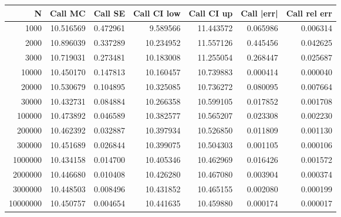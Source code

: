 \begin{tabular}{rrrrrrr}
\toprule
N & Call MC & Call SE & Call CI low & Call CI up & Call |err| & Call rel err \\
\midrule
1000 & 10.516569 & 0.472961 & 9.589566 & 11.443572 & 0.065986 & 0.006314 \\
2000 & 10.896039 & 0.337289 & 10.234952 & 11.557126 & 0.445456 & 0.042625 \\
3000 & 10.719031 & 0.273481 & 10.183008 & 11.255054 & 0.268447 & 0.025687 \\
10000 & 10.450170 & 0.147813 & 10.160457 & 10.739883 & 0.000414 & 0.000040 \\
20000 & 10.530679 & 0.104895 & 10.325085 & 10.736272 & 0.080095 & 0.007664 \\
30000 & 10.432731 & 0.084884 & 10.266358 & 10.599105 & 0.017852 & 0.001708 \\
100000 & 10.473892 & 0.046589 & 10.382577 & 10.565207 & 0.023308 & 0.002230 \\
200000 & 10.462392 & 0.032887 & 10.397934 & 10.526850 & 0.011809 & 0.001130 \\
300000 & 10.451689 & 0.026844 & 10.399075 & 10.504303 & 0.001105 & 0.000106 \\
1000000 & 10.434158 & 0.014700 & 10.405346 & 10.462969 & 0.016426 & 0.001572 \\
2000000 & 10.446680 & 0.010408 & 10.426280 & 10.467080 & 0.003904 & 0.000374 \\
3000000 & 10.448503 & 0.008496 & 10.431852 & 10.465155 & 0.002080 & 0.000199 \\
10000000 & 10.450757 & 0.004654 & 10.441635 & 10.459880 & 0.000174 & 0.000017 \\
\bottomrule
\end{tabular}
